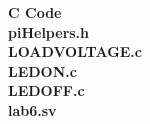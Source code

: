 \documentclass[11pt,letterpaper]{article}
\begin{document}
\noindent\textbf{C Code}\\
\lstset{language=C}
\noindent\textbf{piHelpers.h}\\

\noindent\textbf{LOADVOLTAGE.c}\\

\noindent\textbf{LEDON.c}\\

\noindent\textbf{LEDOFF.c}\\

\noindent\textbf{lab6.sv}\\

\end{document}
